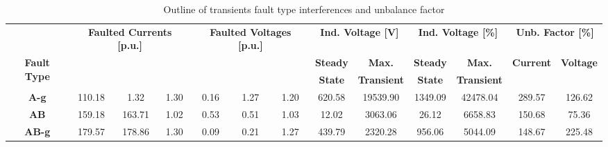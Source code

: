 \documentclass[5p,twocolumn]{elsarticle}
\begin{document}
\begin{table}[ht]
	\centering
	\caption{Outline of transients fault type interferences and unbalance factor}
	\footnotesize
	\begin{tabular}{ccccccccccccc}
		\textbf{}                            & \multicolumn{3}{c}{\textbf{Faulted Currents   {[}p.u.{]}}}                     & \multicolumn{3}{c}{\textbf{Faulted   Voltages {[}p.u.{]}}}                     & \multicolumn{2}{c}{\textbf{Ind.   Voltage {[}V{]}}} & \multicolumn{2}{c}{\textbf{Ind.   Voltage {[}\%{]}}} & \multicolumn{2}{c}{\textbf{Unb.   Factor {[}\%{]}}}              \\ \cline{2-13} 
		\multirow{2}{*}{\textbf{Fault Type}} & \multirow{2}{*}{\boldmath{$|I_{a}|$}} & \multirow{2}{*}{\boldmath{$|I_{b}|$}} & \multirow{2}{*}{\boldmath{$|I_{c}|$}} & \multirow{2}{*}{\boldmath{$|V_{a}|$}} & \multirow{2}{*}{\boldmath{$|V_{b}|$}} & \multirow{2}{*}{\boldmath{$|V_{c}|$}} & \textbf{Steady}         & \textbf{Max.}             & \textbf{Steady}         & \textbf{Max.}              & \multirow{2}{*}{\textbf{Current}} & \multirow{2}{*}{\textbf{Voltage}} \\
		&                          &                          &                          &                          &                          &                          & \textbf{State}          & \textbf{Transient}        & \textbf{State}          & \textbf{Transient}         &                                   &                                   \\ \hline
		\textbf{A-g}                         & 110.18                   & 1.32                     & 1.30                     & 0.16                     & 1.27                     & 1.20                     & 620.58                  & 19539.90                  & 1349.09                 & 42478.04                   & 289.57                            & 126.62                            \\
		\textbf{AB}                          & 159.18                   & 163.71                   & 1.02                     & 0.53                     & 0.51                     & 1.03                     & 12.02                   & 3063.06                   & 26.12                   & 6658.83                    & 150.68                            & 75.36                             \\
		\textbf{AB-g}                        & 179.57                   & 178.86                   & 1.30                     & 0.09                     & 0.21                     & 1.27                     & 439.79                  & 2320.28                   & 956.06                  & 5044.09                    & 148.67                            & 225.48                            \\

\end{tabular}
\end{table}
\end{document}
